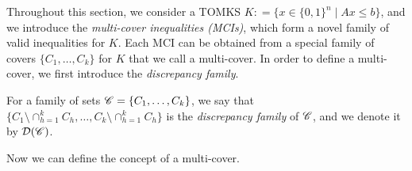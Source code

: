 Throughout this section, we consider a TOMKS $K : = \{x \in \{0,1\}^n \mid Ax \leq b\}$, and we introduce the \emph{multi-cover inequalities (MCIs)}, which form a novel family of valid inequalities for $K$.
Each MCI can be obtained from a special family of covers $\{C_1, \ldots, C_k\}$ for $K$ that we call a multi-cover.
In order to define a multi-cover,
we first introduce the \emph{discrepancy family}.
\begin{definition}
For a family of sets $\mathscr{C} = \{C_1, \ldots, C_k\}$, we say that $\{C_1 \setminus \cap_{h=1}^k C_h, \ldots, C_k \setminus \cap_{h=1}^k C_h\}$ is the \emph{discrepancy family} of $\mathscr{C}$, and we denote it by $\mathcal D(\mathscr{C})$.
\end{definition}


%
%
%
%
%
Now we can define the concept of a multi-cover.


